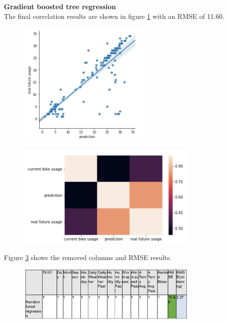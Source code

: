 \textbf{Gradient boosted tree regression}\\
The final correlation results are shown in figure \ref{fig:image1b} with an RMSE of 11.60.
\begin{figure}[H]
\centering
\includegraphics[width=0.6\textwidth]{media/image1b}\label{fig:image1b}
\label{fig:image1b}
\end{figure}
\begin{figure}[H]
\centering
\includegraphics[width=0.8\textwidth]{media/image1c}\label{fig:image1c}
\label{fig:image1c}
\end{figure}
Figure \ref{fig:anasst6} shows the removed columns and RMSE results.
\begin{figure}[H]
\centering
\includegraphics[width=0.8\textwidth]{media/anasst5}\label{fig:anasst6}
\label{fig:anasst6}
\end{figure}
